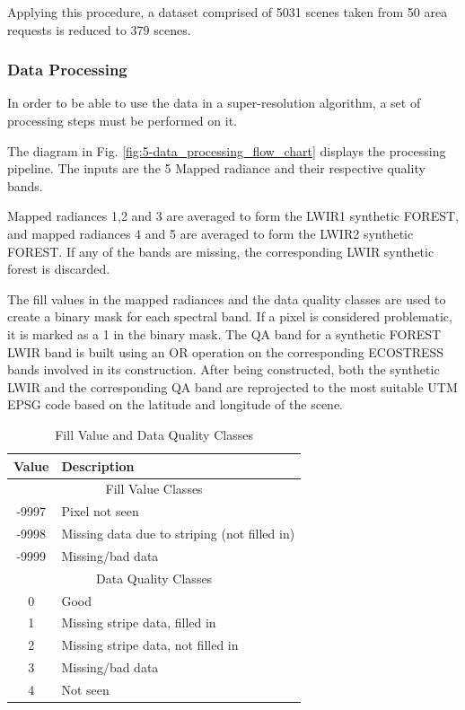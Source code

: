 Applying this procedure, a dataset comprised of 5031 scenes taken from 50 area requests is reduced to 379 scenes.

\subsubsection{Data Processing}

In order to be able to use the data in a super-resolution algorithm, a set of processing steps must be performed on it.

The diagram in Fig. \ref{fig:5-data_processing_flow_chart} displays the processing pipeline. The inputs are the 5 Mapped radiance and their respective quality bands.

Mapped radiances 1,2 and 3 are averaged to form the LWIR1 synthetic FOREST, and mapped radiances 4 and 5 are averaged to form the LWIR2 synthetic FOREST. If any of the bands are missing, the corresponding LWIR synthetic forest is discarded. 

The fill values in the mapped radiances and the data quality classes are used to create a binary mask for each spectral band. If a pixel is considered problematic, it is marked as a 1 in the binary mask. The QA band for a synthetic FOREST LWIR band is built using an OR operation on the corresponding ECOSTRESS bands involved in its construction. After being constructed, both the synthetic LWIR and the corresponding QA band are reprojected to the most suitable UTM EPSG code based on the latitude and longitude of the scene.

\begin{table}[h!]
    \centering
    
    \label{tab:quality_classes}
    \begin{tabular}{cl}
        \toprule
        \textbf{Value} & \textbf{Description}                \\
        \midrule
        \multicolumn{2}{c}{Fill Value Classes}                \\
        -9997          & Pixel not seen                       \\
        -9998          & Missing data due to striping (not filled in) \\
        -9999          & Missing/bad data                     \\
        \midrule
        \multicolumn{2}{c}{Data Quality Classes}              \\
        0              & Good                                 \\
        1              & Missing stripe data, filled in       \\
        2              & Missing stripe data, not filled in   \\
        3              & Missing/bad data                     \\
        4              & Not seen                             \\
        \bottomrule
    \end{tabular}
    \caption{Fill Value and Data Quality Classes}
\end{table}

